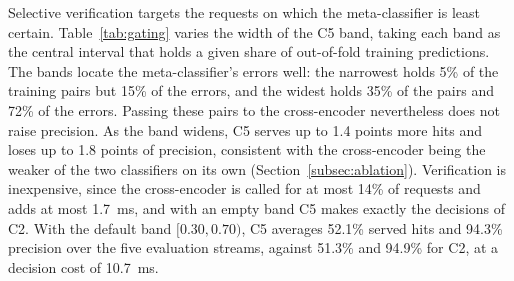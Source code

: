 \documentclass[authoryear,preprint,review,12pt]{elsarticle}
\begin{document}
\begin{table}[htbp]
\centering
\caption{Scoring the $k$ nearest cached entries and serving the best accepted candidate on the seed-42 stream. The candidates of one request are scored in a single batched call.}
\label{tab:topk}
\end{table}

Selective verification targets the requests on which the meta-classifier is least certain. Table~\ref{tab:gating} varies the width of the C5 band, taking each band as the central interval that holds a given share of out-of-fold training predictions. The bands locate the meta-classifier's errors well: the narrowest holds 5\% of the training pairs but 15\% of the errors, and the widest holds 35\% of the pairs and 72\% of the errors. Passing these pairs to the cross-encoder nevertheless does not raise precision. As the band widens, C5 serves up to 1.4 points more hits and loses up to 1.8 points of precision, consistent with the cross-encoder being the weaker of the two classifiers on its own (Section~\ref{subsec:ablation}). Verification is inexpensive, since the cross-encoder is called for at most 14\% of requests and adds at most 1.7~ms, and with an empty band C5 makes exactly the decisions of C2. With the default band $[0.30,0.70)$, C5 averages 52.1\% served hits and 94.3\% precision over the five evaluation streams, against 51.3\% and 94.9\% for C2, at a decision cost of 10.7~ms.
\end{document}
